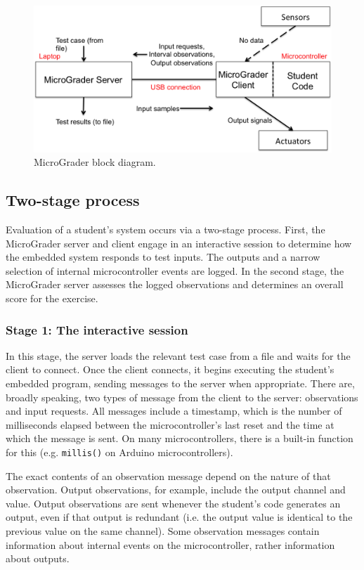 \documentclass[12pt]{article}
\begin{document}
\begin{figure}[h]
\centering
\includegraphics[scale=0.8]{test-mode.png}
\caption{MicroGrader block diagram.}
\label{fig:test-mode}
\end{figure}

\subsection{Two-stage process}
Evaluation of a student's system occurs via a two-stage process.  First, the MicroGrader server and client engage in an interactive session to determine how the embedded system responds to test inputs.  The outputs and a narrow selection of internal microcontroller events are logged.  In the second stage, the MicroGrader server assesses the logged observations and determines an overall score for the exercise.

\subsubsection{Stage 1: The interactive session}
In this stage, the server loads the relevant test case from a file and waits for the client to connect.  Once the client connects, it begins executing the student's embedded program, sending messages to the server when appropriate.  There are, broadly speaking, two types of message from the client to the server: observations and input requests.  All messages include a timestamp, which is the number of milliseconds elapsed between the microcontroller's last reset and the time at which the message is sent.  On many microcontrollers, there is a built-in function for this (e.g. \texttt{millis()} on Arduino microcontrollers).

The exact contents of an observation message depend on the nature of that observation.  Output observations, for example, include the output channel and value.  Output observations are sent whenever the student's code generates an output, even if that output is redundant (i.e. the output value is identical to the previous value on the same channel).  Some observation messages contain information about internal events on the microcontroller, rather information about outputs.
\end{document}
